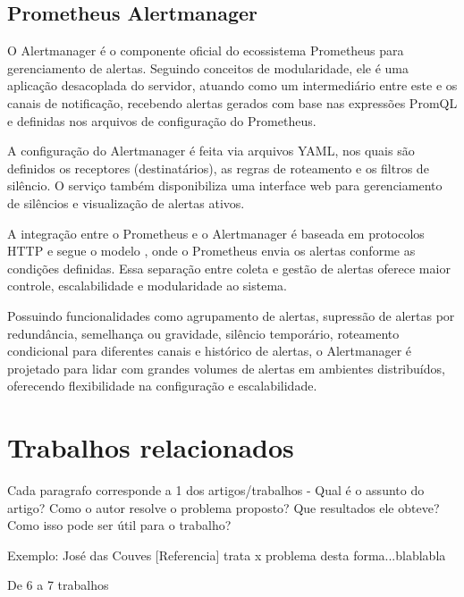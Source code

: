 \subsection{Prometheus Alertmanager}
\label{subsection:PrometheusAlertmanager}

O Alertmanager \citep{promalertmanager2025}
é o componente oficial do ecossistema Prometheus para gerenciamento de alertas. Seguindo conceitos de modularidade, ele é uma aplicação desacoplada do servidor, atuando como um intermediário entre este e os canais de notificação, recebendo alertas gerados com base nas expressões PromQL e definidas nos arquivos de configuração do Prometheus.

A configuração do Alertmanager é feita via arquivos YAML, nos quais são definidos os receptores (destinatários), as regras de roteamento e os filtros de silêncio. O serviço também disponibiliza uma interface web para gerenciamento de silêncios e visualização de alertas ativos.

A integração entre o Prometheus e o Alertmanager é baseada em protocolos HTTP e segue o modelo , onde o Prometheus envia os alertas conforme as condições definidas. Essa separação entre coleta e gestão de alertas oferece maior controle, escalabilidade e modularidade ao sistema.

Possuindo funcionalidades como agrupamento de alertas, supressão de alertas por redundância, semelhança ou gravidade, silêncio temporário, roteamento condicional para diferentes canais e histórico de alertas, o Alertmanager  é projetado para lidar com grandes volumes de alertas em ambientes distribuídos, oferecendo flexibilidade na configuração e escalabilidade.

\section{Trabalhos relacionados}
\label{section:TrabalhosRelacionados}

Cada paragrafo corresponde a 1 dos artigos/trabalhos - Qual é o assunto do artigo? Como o autor resolve o problema proposto? Que resultados ele obteve? Como isso pode ser útil para o trabalho?

Exemplo: José das Couves [Referencia] trata x problema desta forma...blablabla

De 6 a 7 trabalhos